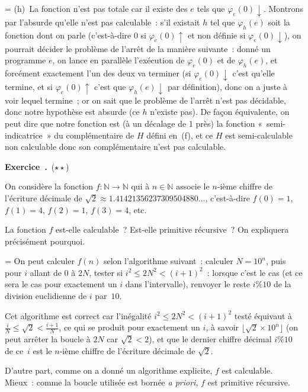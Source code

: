 \documentclass[12pt,a4paper]{article}
\theoremstyle{definition}
\newcommand\exercice{%
\refstepcounter{comcnt}\bigskip\noindent\textbf{Exercice~\thecomcnt.}}
\newif\ifcorrige
\newenvironment{corrige}%
{\ifcorrige\relax\else\setbox0=\vbox\bgroup\fi%
\smallbreak\footnotesize\noindent{\underbar{\textit{Corrigé.}}\quad}}
{{\hbox{}\nobreak\hfill\checkmark}%
\ifcorrige\relax\else\egroup\fi\par}
\begin{document}
\begin{corrige}
(h) La fonction n'est pas totale car il existe des $e$ tels que
  $\varphi_e(0)\downarrow$.  Montrons par l'absurde qu'elle n'est pas
  calculable : s'il existait $h$ tel que $\varphi_h(e)$ soit la
  fonction dont on parle (c'est-à-dire $0$ si $\varphi_e(0)\uparrow$
  et non définie si $\varphi_e(0)\downarrow$), on pourrait décider le
  problème de l'arrêt de la manière suivante : donné un programme $e$,
  on lance en parallèle l'exécution de $\varphi_e(0)$ et de
  $\varphi_h(e)$, et forcément exactement l'un des deux va terminer
  (si $\varphi_e(0)\downarrow$ c'est qu'elle termine, et si
  $\varphi_e(0)\uparrow$ c'est que $\varphi_h(e)\downarrow$ par
  définition), donc on a juste à voir lequel termine ; or on sait que
  le problème de l'arrêt n'est pas décidable, donc notre hypothèse est
  absurde (ce $h$ n'existe pas).  De façon équivalente, on peut dire
  que notre fonction est (à un décalage de $1$ près) la fonction
  « semi-indicatrice » du complémentaire de $H$ défini en (f), et ce
  $H$ est semi-calculable non calculable donc son complémentaire n'est
  pas calculable.
\end{corrige}

%

\exercice\ (${\star}{\star}$)\par\nobreak

On considère la fonction $f\colon \mathbb{N} \to \mathbb{N}$ qui à $n
\in \mathbb{N}$ associe le $n$-ième chiffre de l'écriture décimale de
$\sqrt{2} \approx 1.41421356237309504880\ldots$, c'est-à-dire $f(0) =
1$, $f(1) = 4$, $f(2) = 1$, $f(3) = 4$, etc.

La fonction $f$ est-elle calculable ?  Est-elle primitive récursive ?
On expliquera précisément pourquoi.

\begin{corrige}
On peut calculer $f(n)$ selon l'algorithme suivant : calculer $N =
10^n$, puis pour $i$ allant de $0$ à $2N$, tester si $i^2 \leq 2 N^2 <
(i+1)^2$ : lorsque c'est le cas (et ce sera le cas pour exactement un
$i$ dans l'intervalle), renvoyer le reste $i\% 10$ de la division
euclidienne de $i$ par $10$.

Cet algorithme est correct car l'inégalité $i^2 \leq 2 N^2 < (i+1)^2$
testé équivaut à $\frac{i}{N} \leq \sqrt{2} < \frac{i+1}{N}$, ce qui
se produit pour exactement un $i$, à savoir $\lfloor \sqrt{2}\times
10^n \rfloor$ (on peut arrêter la boucle à $2N$ car $\sqrt{2} < 2$),
et que le dernier chiffre décimal $i\% 10$ de ce $i$ est le $n$-ième
chiffre de l'écriture décimale de $\sqrt{2}$.

D'autre part, comme on a donné un algorithme explicite, $f$ est
calculable.  Mieux : comme la boucle utilisée est bornée \textit{a
  priori}, $f$ est primitive récursive.
\end{corrige}
\end{document}

